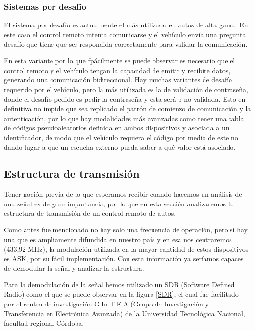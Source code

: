 \documentclass[12pt]{report}
\begin{document}
\subsubsection{Sistemas por desafío}

El sistema por desafío es actualmente el más utilizado en autos de alta gama. En este caso el control remoto intenta comunicarse y
el vehículo envía una pregunta desafío que tiene que ser respondida correctamente para validar la comunicación.\par
En esta variante por lo que fpácilmente se puede observar es necesario que el control remoto y el vehículo tengan la capacidad de
emitir y recibire datos, generando una comunicación bidireccional.
Hay muchas variantes de desafío requerido por el vehículo, pero la más utilizada es la de validación de contraseña, donde el desafío pedido
es pedir la contraseña y esta será o no validada. Esto en definitiva no impide que sea replicado el patrón de comienzo de comunicación y 
la autenticación, por lo que hay modalidades más avanzadas como tener una tabla de códigos pseudoaleatorios definida en ambos dispositivos
y asociada a un identificador, de modo que el vehículo requiera el código por medio de este no dando lugar a que un escucha externo pueda saber
a qué valor está asociado.

\subsection{Estructura de transmisión}

Tener noción previa de lo que esperamos recibir cuando hacemos un análisis de una señal es de gran importancia, por lo que en esta sección 
analizaremos la estructura de transmisión de un control remoto de autos.\par
Como antes fue mencionado no hay solo una frecuencia de operación, pero sí hay una que es ampliamente difundida en nuestro país y en esa nos 
centraremos (433,92 MHz), la modulación utilizada en la mayor cantidad de estos dispositivos es ASK, por su fácil implementación. Con esta
información ya seríamos capaces de demodular la señal y analizar la estructura.\par 
Para la demodulación de la señal hemos utilizado un SDR (Software Defined Radio) como el que se puede observar en la figura \ref{SDR}, el cual
fue facilitado por el centro de investigación G.In.T.E.A (Grupo de Investigación y Transferencia en Electrónica Avanzada) de la Universidad
Tecnológica Nacional, facultad regional Córdoba.\par
\end{document}
